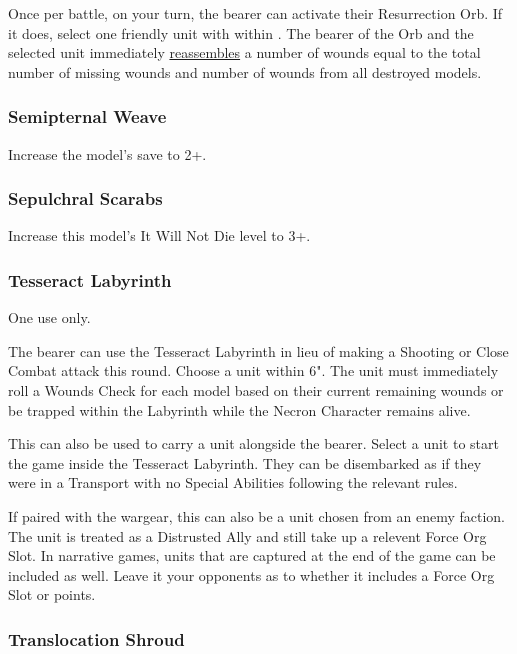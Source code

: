 Once per battle, on your turn, the bearer can activate their Resurrection Orb. If it does, select one friendly unit with  within . The bearer of the Orb and the selected unit immediately \textcolor{violet}{\hyperref[Reanimation Protocols]{reassembles}} a number of wounds equal to the total number of missing wounds and number of wounds from all destroyed models.

\subsubsection{Semipternal Weave} \label{Sempiternal Weave}

Increase the model's save to 2+.

\subsubsection{Sepulchral Scarabs} \label{Sepulchral Scarabs}

Increase this model's It Will Not Die level to 3+.

\subsubsection{Tesseract Labyrinth} \label{Tesseract Labyrinth}

One use only.

The bearer can use the Tesseract Labyrinth in lieu of making a Shooting or Close Combat attack this round. Choose a unit within 6". The unit must immediately roll a Wounds Check for each model based on their current remaining wounds or be trapped within the Labyrinth while the Necron Character remains alive.

This can also be used to carry a unit alongside the bearer. Select a unit to start the game inside the Tesseract Labyrinth. They can be disembarked as if they were in a Transport with no Special Abilities following the relevant rules. 

If paired with the  wargear, this can also be a unit chosen from an enemy faction. The unit is treated as a Distrusted Ally and still take up a relevent Force Org Slot. In narrative games, units that are captured at the end of the game can be included as well. Leave it your opponents as to whether it includes a Force Org Slot or points.

\subsubsection{Translocation Shroud} \label{Translocation Shroud}

